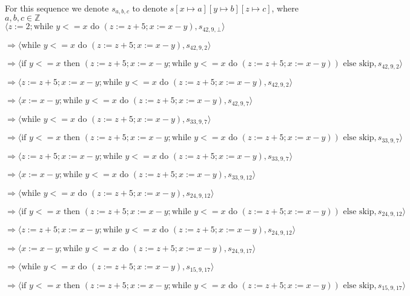 \documentclass[varwidth=100cm]{standalone}
\begin{document}
For this sequence we denote $s_{a,b,c}$ to denote $s[x\mapsto a][y\mapsto b][z\mapsto c]$, where $a,b,c\in \mathbb{Z}$ \\ 


$ \langle z := 2; \text{while }y <= x\text{ do }(z := z + 5; x := x - y), s_{42,9,\bot} \rangle $

$ \Rightarrow \langle \text{while }y <= x\text{ do }(z := z + 5; x := x - y), s_{42,9,2} \rangle $

$ \Rightarrow \langle \text{if }y <= x\text{ then }(z := z + 5; x := x - y; \text{while }y <= x\text{ do }(z := z + 5; x := x - y))\text{ else }\text{skip}, s_{42,9,2} \rangle $

$ \Rightarrow \langle z := z + 5; x := x - y; \text{while }y <= x\text{ do }(z := z + 5; x := x - y), s_{42,9,2} \rangle $

$ \Rightarrow \langle x := x - y; \text{while }y <= x\text{ do }(z := z + 5; x := x - y), s_{42,9,7} \rangle $

$ \Rightarrow \langle \text{while }y <= x\text{ do }(z := z + 5; x := x - y), s_{33,9,7} \rangle $

$ \Rightarrow \langle \text{if }y <= x\text{ then }(z := z + 5; x := x - y; \text{while }y <= x\text{ do }(z := z + 5; x := x - y))\text{ else }\text{skip}, s_{33,9,7} \rangle $

$ \Rightarrow \langle z := z + 5; x := x - y; \text{while }y <= x\text{ do }(z := z + 5; x := x - y), s_{33,9,7} \rangle $

$ \Rightarrow \langle x := x - y; \text{while }y <= x\text{ do }(z := z + 5; x := x - y), s_{33,9,12} \rangle $

$ \Rightarrow \langle \text{while }y <= x\text{ do }(z := z + 5; x := x - y), s_{24,9,12} \rangle $

$ \Rightarrow \langle \text{if }y <= x\text{ then }(z := z + 5; x := x - y; \text{while }y <= x\text{ do }(z := z + 5; x := x - y))\text{ else }\text{skip}, s_{24,9,12} \rangle $

$ \Rightarrow \langle z := z + 5; x := x - y; \text{while }y <= x\text{ do }(z := z + 5; x := x - y), s_{24,9,12} \rangle $

$ \Rightarrow \langle x := x - y; \text{while }y <= x\text{ do }(z := z + 5; x := x - y), s_{24,9,17} \rangle $

$ \Rightarrow \langle \text{while }y <= x\text{ do }(z := z + 5; x := x - y), s_{15,9,17} \rangle $

$ \Rightarrow \langle \text{if }y <= x\text{ then }(z := z + 5; x := x - y; \text{while }y <= x\text{ do }(z := z + 5; x := x - y))\text{ else }\text{skip}, s_{15,9,17} \rangle $
\end{document}
